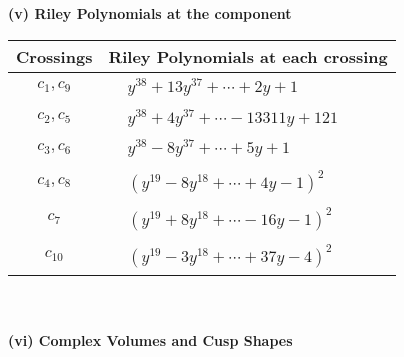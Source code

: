 \documentclass[1p]{elsarticle_modified}
\theoremstyle{definition}
\begin{document}
\newpage\renewcommand{\arraystretch}{1}
\flushleft \textbf{(v) Riley Polynomials at the component}\newline \\
\begin{tabular}{m{50pt}|m{274pt}}
Crossings & \hspace{64pt}Riley Polynomials at each crossing \\
\hline $$\begin{aligned}c_{1},c_{9}\end{aligned}$$&$\begin{aligned}
&y^{38}+13 y^{37}+\cdots+2 y+1
\end{aligned}$\\
\hline $$\begin{aligned}c_{2},c_{5}\end{aligned}$$&$\begin{aligned}
&y^{38}+4 y^{37}+\cdots-13311 y+121
\end{aligned}$\\
\hline $$\begin{aligned}c_{3},c_{6}\end{aligned}$$&$\begin{aligned}
&y^{38}-8 y^{37}+\cdots+5 y+1
\end{aligned}$\\
\hline $$\begin{aligned}c_{4},c_{8}\end{aligned}$$&$\begin{aligned}
&(y^{19}-8 y^{18}+\cdots+4 y-1)^{2}
\end{aligned}$\\
\hline $$\begin{aligned}c_{7}\end{aligned}$$&$\begin{aligned}
&(y^{19}+8 y^{18}+\cdots-16 y-1)^{2}
\end{aligned}$\\
\hline $$\begin{aligned}c_{10}\end{aligned}$$&$\begin{aligned}
&(y^{19}-3 y^{18}+\cdots+37 y-4)^{2}
\end{aligned}$\\
\hline
\end{tabular}\\~\\
\newpage\flushleft \textbf{(vi) Complex Volumes and Cusp Shapes}
\end{document}
